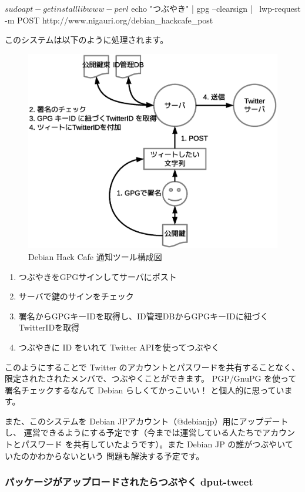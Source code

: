 \documentclass[mingoth,a4paper]{jsarticle}
\begin{document}
\begin{commandline}
$ sudo apt-get install libwww-perl
$ echo "つぶやき" | gpg --clearsign | \
  lwp-request -m POST http://www.nigauri.org/debian_hackcafe_post
\end{commandline}

このシステムは以下のように処理されます。

\begin{figure}[h]
\begin{center}
\includegraphics[width=0.7\hsize]{image201201/debianmeeting201201-imagedata-twgw.eps}
\caption{Debian Hack Cafe 通知ツール構成図}
\label{fig:debian-kernel-team}
\end{center}
\end{figure}

\begin{enumerate}
\item つぶやきをGPGサインしてサーバにポスト
\item サーバで鍵のサインをチェック
\item 署名からGPGキーIDを取得し、ID管理DBからGPGキーIDに紐づくTwitterIDを取得
\item つぶやきに ID をいれて Twitter APIを使ってつぶやく 
\end{enumerate}

このようにすることで Twitter のアカウントとパスワードを共有することなく、
限定されたされたメンバで、つぶやくことができます。
PGP/GnuPG を使って署名チェックするなんて Debian らしくてかっこいい！
と個人的に思っています。

また、このシステムを Debian JPアカウント（@debianjp）用にアップデートし、
運営できるようにする予定です（今までは運営している人たちでアカウントとパスワード
を共有していたようです）。また Debian JP の誰がつぶやいていたのかわからないという
問題も解決する予定です。

\subsubsection{パッケージがアップロードされたらつぶやく dput-tweet}
\end{document}
